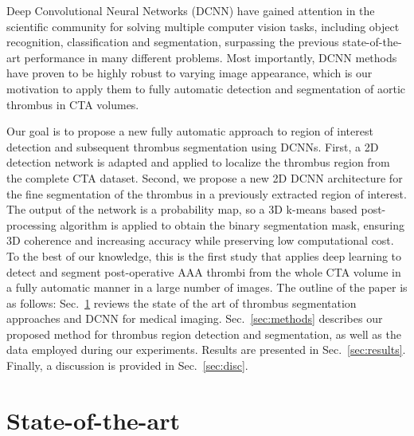 \documentclass[preprint,authoryear,12pt]{elsarticle}
\begin{document}
Deep Convolutional Neural Networks (DCNN) have gained attention in the scientific community for solving multiple computer vision tasks, including object recognition, classification and segmentation, surpassing the previous state-of-the-art performance in many different problems. Most importantly, DCNN methods have proven to be highly robust to varying image appearance, which is our motivation to apply them to fully automatic detection and segmentation of aortic thrombus in CTA volumes. \par

Our goal is to propose a new fully automatic approach to region of interest detection and subsequent thrombus segmentation using DCNNs. First, a 2D detection network is adapted and applied to localize the thrombus region from the complete CTA dataset. Second, we propose a new 2D DCNN architecture for the fine segmentation of the thrombus in a previously extracted region of interest. The output of the network is a probability map, so a 3D k-means based post-processing algorithm is applied to obtain the binary segmentation mask, ensuring 3D coherence and increasing accuracy while preserving low computational cost. To the best of our knowledge, this is the first study that applies deep learning to detect and segment post-operative AAA thrombi from the whole CTA volume in a fully automatic manner in a large number of images. 
The outline of the paper is as follows: Sec.~\ref{sec:soa} reviews the state of the art of thrombus segmentation approaches and DCNN for medical imaging. Sec.~\ref{sec:methods} describes our proposed method for thrombus region detection and segmentation, as well as the data employed during our experiments. Results are presented in Sec.~\ref{sec:results}. Finally, a discussion is provided in Sec.~\ref{sec:disc}.
 
\section{State-of-the-art}
\label{sec:soa}
\end{document}
